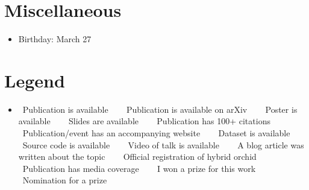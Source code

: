 \documentclass[line,mm]{res}
\newcounter{x}
\newcounter{y}
\newcounter{z}
\begin{document}
\begin{resume}
\section{Miscellaneous}
\begin{itemize}
  \item Birthday:  March 27
\end{itemize}

\section{Legend}
\begin{itemize}
  \item[]
    \faFileTextO~Publication is available ~~
    \faFileExcelO~Publication is available on arXiv ~~
    \faFilePictureO~Poster is available ~~
    \faSlideshare~Slides are available ~~
    \faQuoteRight~Publication has 100+ citations ~~
    \faChain~Publication/event has an accompanying website ~~
    \faDatabase~Dataset is available ~~
    \faCog~Source code is available ~~
    \faVideoCamera~Video of talk is available ~~
    \faComment~A blog article was written about the topic ~~
    \faLeaf~Official registration of hybrid orchid ~~
    \faNewspaperO~Publication has media coverage ~~
    \faStar~I won a prize for this work ~~
    \faStarO~Nomination for a prize 
\end{itemize}

\end{resume}
\end{document}
